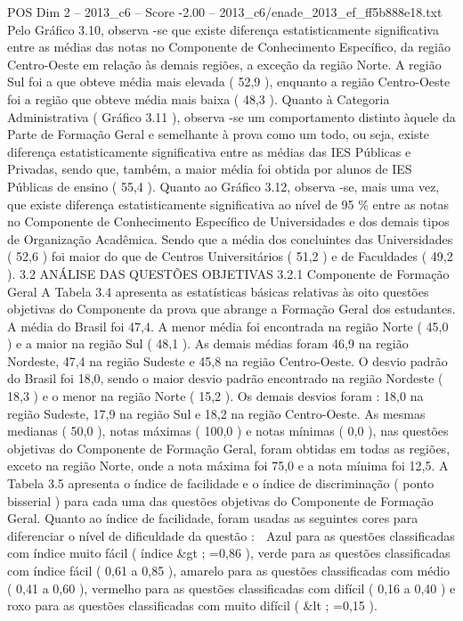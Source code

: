 \begin{textsample}{POS Dim 2 – 2013\_c6 – Score -2.00 – 2013\_c6/enade\_2013\_ef\_ff5b888e18.txt}
Pelo Gráfico 3.10, observa -se que existe diferença estatisticamente significativa entre as médias das notas no Componente de Conhecimento Específico, da região Centro-Oeste em relação às demais regiões, a exceção da região Norte.
A região Sul foi a que obteve média mais elevada ( 52,9 ), enquanto a região Centro-Oeste foi a região que obteve média mais baixa ( 48,3 ).
Quanto à Categoria Administrativa ( Gráfico 3.11 ), observa -se um comportamento distinto àquele da Parte de Formação Geral e semelhante à prova como um todo, ou seja, existe diferença estatisticamente significativa entre as médias das IES Públicas e Privadas, sendo que, também, a maior média foi obtida por alunos de IES Públicas de ensino ( 55,4 ).
Quanto ao Gráfico 3.12, observa -se, mais uma vez, que existe diferença estatisticamente significativa ao nível de 95 \% entre as notas no Componente de Conhecimento Específico de Universidades e dos demais tipos de Organização Acadêmica.
Sendo que a média dos concluintes das Universidades ( 52,6 ) foi maior do que de Centros Universitários ( 51,2 ) e de Faculdades ( 49,2 ). 3.2 ANÁLISE DAS QUESTÕES OBJETIVAS 3.2.1 Componente de Formação Geral A Tabela 3.4 apresenta as estatísticas básicas relativas às oito questões objetivas do Componente da prova que abrange a Formação Geral dos estudantes.
A média do Brasil foi 47,4.
A menor média foi encontrada na região Norte ( 45,0 ) e a maior na região Sul ( 48,1 ).
As demais médias foram 46,9 na região Nordeste, 47,4 na região Sudeste e 45,8 na região Centro-Oeste.
O desvio padrão do Brasil foi 18,0, sendo o maior desvio padrão encontrado na região Nordeste ( 18,3 ) e o menor na região Norte ( 15,2 ).
Os demais desvios foram : 18,0 na região Sudeste, 17,9 na região Sul e 18,2 na região Centro-Oeste.
As mesmas medianas ( 50,0 ), notas máximas ( 100,0 ) e notas mínimas ( 0,0 ), nas questões objetivas do Componente de Formação Geral, foram obtidas em todas as regiões, exceto na região Norte, onde a nota máxima foi 75,0 e a nota mínima foi 12,5.
A Tabela 3.5 apresenta o índice de facilidade e o índice de discriminação ( ponto bisserial ) para cada uma das questões objetivas do Componente de Formação Geral.
Quanto ao índice de facilidade, foram usadas as seguintes cores para diferenciar o nível de dificuldade da questão :  Azul para as questões classificadas com índice muito fácil ( índice \&gt ; =0,86 ), verde para as questões classificadas com índice fácil ( 0,61 a 0,85 ), amarelo para as questões classificadas com médio ( 0,41 a 0,60 ), vermelho para as questões classificadas com difícil ( 0,16 a 0,40 ) e roxo para as questões classificadas com muito difícil ( \&lt ; =0,15 ).

\end{textsample}

